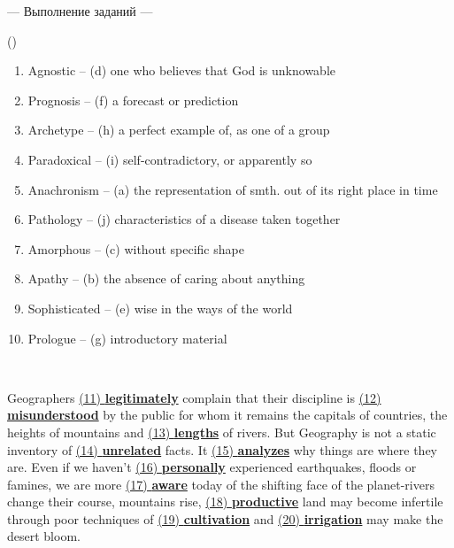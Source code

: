 \documentclass[main.tex]{subfiles}
\begin{document}


\hypertarget{ltask:2024-05-14}{--- Выполнение заданий ---} (\hyperref[task:2024-05-14]{\color{blue}{перейти к тексту заданий}})
\\


\begin{enumerate}[nosep,leftmargin=10mm]
	\itemsep\eitsp
	\setcounter{enumi}{0}
	\item Agnostic -- (d) one who believes that God is unknowable
	\item Prognosis -- (f) a forecast or prediction
	\item Archetype -- (h) a perfect example of, as one of a group
	\item Paradoxical -- (i) self-contradictory, or apparently so
	\item Anachronism -- (a) the representation of smth. out of its right place in time
	\item Pathology -- (j) characteristics of a disease taken together
	\item Amorphous -- (c) without specific shape
	\item Apathy -- (b) the absence of caring about anything
	\item Sophisticated -- (e) wise in the ways of the world
	\item Prologue -- (g) introductory material
\end{enumerate}
\ 



Geographers \uline{(11) \textbf{legitimately}} complain that their discipline is \uline{(12) \textbf{misunderstood}} by the public for whom it remains the capitals of countries, the heights of mountains and \uline{(13) \textbf{lengths}} of rivers.
But Geography is not a static inventory of \uline{(14) \textbf{unrelated}} facts.
It \uline{(15) \textbf{analyzes}} why things are where they are. Even if we haven't \uline{(16) \textbf{personally}} experienced earthquakes, floods or famines, we are more \uline{(17) \textbf{aware}} today of the shifting face of the planet-rivers change their course, mountains rise, \uline{(18) \textbf{productive}} land may become infertile through poor techniques of \uline{(19) \textbf{cultivation}} and \uline{(20) \textbf{irrigation}} may make the desert bloom.
\\
\end{document}
